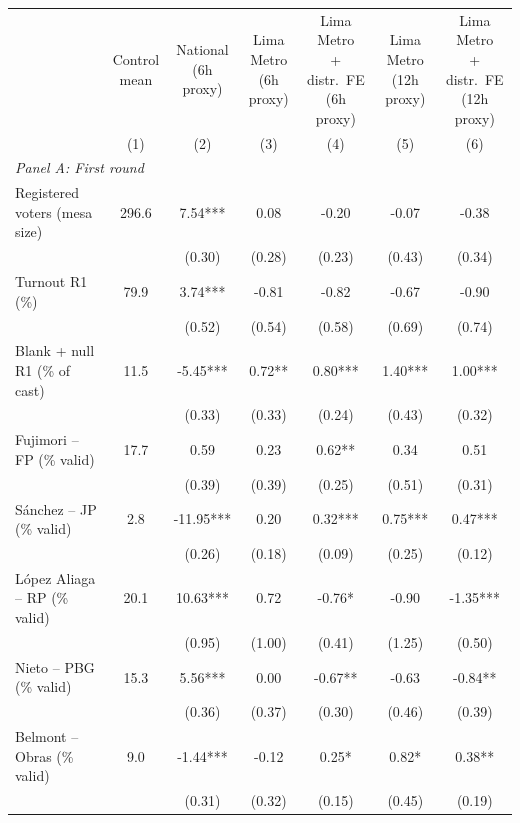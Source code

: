 \begin{tabular}{lcccccc}
\toprule
 & \shortstack{Control\\mean} & \shortstack{National\\(6h proxy)} & \shortstack{Lima Metro\\(6h proxy)} & \shortstack{Lima Metro\\+ distr.\ FE\\(6h proxy)} & \shortstack{Lima Metro\\(12h proxy)} & \shortstack{Lima Metro\\+ distr.\ FE\\(12h proxy)} \\
 & (1) & (2) & (3) & (4) & (5) & (6) \\
\midrule
\multicolumn{7}{l}{\emph{Panel A: First round}} \\
Registered voters (mesa size) & 296.6 & 7.54*** & 0.08 & -0.20 & -0.07 & -0.38 \\
 &  & (0.30) & (0.28) & (0.23) & (0.43) & (0.34) \\[1pt]
Turnout R1 (\%) & 79.9 & 3.74*** & -0.81 & -0.82 & -0.67 & -0.90 \\
 &  & (0.52) & (0.54) & (0.58) & (0.69) & (0.74) \\[1pt]
Blank + null R1 (\% of cast) & 11.5 & -5.45*** & 0.72** & 0.80*** & 1.40*** & 1.00*** \\
 &  & (0.33) & (0.33) & (0.24) & (0.43) & (0.32) \\[1pt]
Fujimori -- FP (\% valid) & 17.7 & 0.59 & 0.23 & 0.62** & 0.34 & 0.51 \\
 &  & (0.39) & (0.39) & (0.25) & (0.51) & (0.31) \\[1pt]
S\'anchez -- JP (\% valid) & 2.8 & -11.95*** & 0.20 & 0.32*** & 0.75*** & 0.47*** \\
 &  & (0.26) & (0.18) & (0.09) & (0.25) & (0.12) \\[1pt]
L\'opez Aliaga -- RP (\% valid) & 20.1 & 10.63*** & 0.72 & -0.76* & -0.90 & -1.35*** \\
 &  & (0.95) & (1.00) & (0.41) & (1.25) & (0.50) \\[1pt]
Nieto -- PBG (\% valid) & 15.3 & 5.56*** & 0.00 & -0.67** & -0.63 & -0.84** \\
 &  & (0.36) & (0.37) & (0.30) & (0.46) & (0.39) \\[1pt]
Belmont -- Obras (\% valid) & 9.0 & -1.44*** & -0.12 & 0.25* & 0.82* & 0.38** \\
 &  & (0.31) & (0.32) & (0.15) & (0.45) & (0.19) \\[1pt]

\end{tabular}
